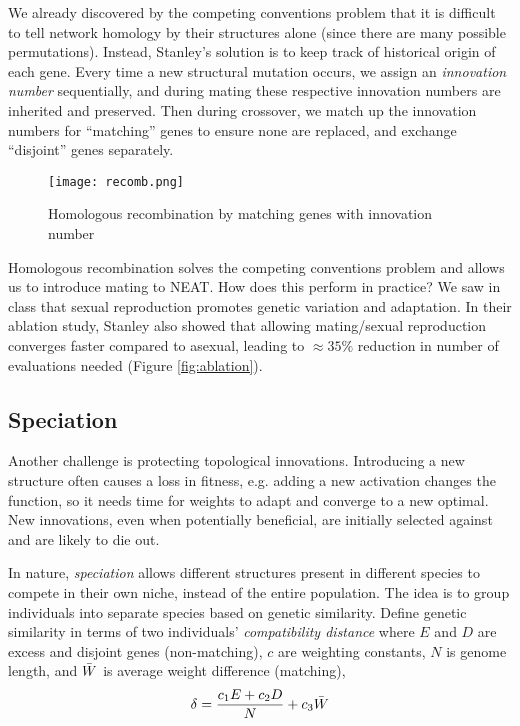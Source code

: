 \documentclass[12pt]{article}
\begin{document}
We already discovered by the competing conventions problem that it is difficult to tell network homology by their structures alone (since there are many possible permutations). Instead, Stanley's solution is to keep track of historical origin of each gene. Every time a new structural mutation occurs, we assign an \textit{innovation number} sequentially, and during mating these respective innovation numbers are inherited and preserved. Then during crossover, we match up the innovation numbers for ``matching'' genes to ensure none are replaced, and exchange ``disjoint'' genes separately.

\begin{figure}
    \centering
    \texttt{[image: recomb.png]}
    \caption{Homologous recombination by matching genes with innovation number}
    \label{fig:recomb}
\end{figure}

Homologous recombination solves the competing conventions problem and allows us to introduce mating to NEAT. How does this perform in practice? We saw in class that sexual reproduction promotes genetic variation and adaptation. In their ablation study, Stanley also showed that allowing mating/sexual reproduction converges faster compared to asexual, leading to $\approx 35\%$ reduction in number of evaluations needed (Figure \ref{fig:ablation}).

\subsection{Speciation}

Another challenge is protecting topological innovations. Introducing a new structure often causes a loss in fitness, e.g. adding a new activation changes the function, so it needs time for weights to adapt and converge to a new optimal. New innovations, even when potentially beneficial, are initially selected against and are likely to die out.

In nature, \textit{speciation} allows different structures present in different species to compete in their own niche, instead of the entire population. The idea is to group individuals into separate species based on genetic similarity. Define genetic similarity in terms of two individuals' \textit{compatibility distance} where $E$ and $D$ are excess and disjoint genes (non-matching), $c$ are weighting constants, $N$ is genome length, and $\Bar{W}$ is average weight difference (matching),
$$\delta=\frac{c_1E+c_2D}{N}+c_3\Bar{W}$$
\end{document}
